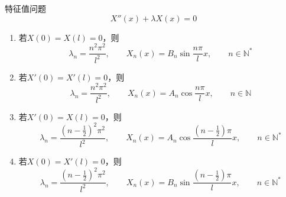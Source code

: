 \documentclass[lang = cn, scheme = chinese, thmcnt = section]{elegantbook}
\newcommand{\N}{\mathbb{N}}            %
\begin{document}
\begin{proposition}
	特征值问题
	\begin{equation}
		X''(x)+\lambda X(x)=0
		\label{二阶线性微分方程程}
		\tag{*}
	\end{equation}
	\begin{enumerate}
		\item 若$X(0)=X(l)=0$，则
		$$
		\lambda_n=\frac{n^2\pi^2}{l^2},\qquad 
		X_n(x)=B_n\sin\frac{n\pi}{l}x,\qquad n\in\N^*
		$$
		\item 若$X'(0)=X'(l)=0$，则
		$$
		\lambda_n=\frac{n^2\pi^2}{l^2},\qquad 
		X_n(x)=A_n\cos\frac{n\pi}{l}x,\qquad n\in\N
		$$
		\item 若$X'(0)=X(l)=0$，则
		$$
		\lambda_n=\frac{\left(n-\frac{1}{2}\right)^2\pi^2}{l^2},\qquad 
		X_n(x)=A_n\cos\frac{\left(n-\frac{1}{2}\right)\pi}{l}x,\qquad n\in\N^*
		$$
		\item 若$X(0)=X'(l)=0$，则
		$$
		\lambda_n=\frac{\left(n-\frac{1}{2}\right)^2\pi^2}{l^2},\qquad 
		X_n(x)=B_n\sin\frac{\left(n-\frac{1}{2}\right)\pi}{l}x,\qquad n\in\N^*
		$$
	\end{enumerate}
\end{proposition}
\end{document}
